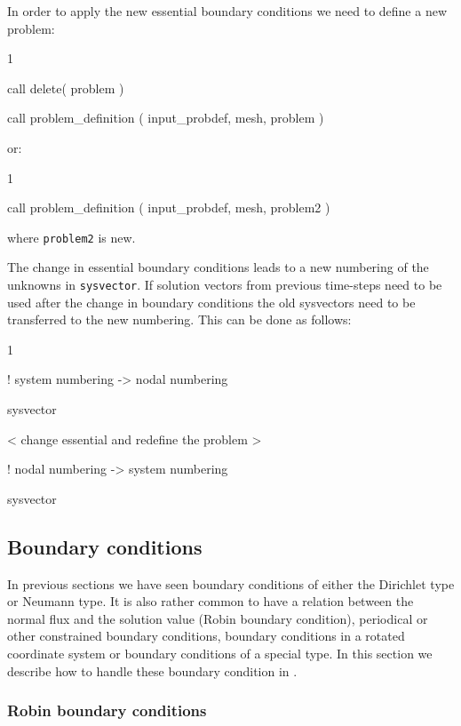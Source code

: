 In order to apply the new essential boundary conditions we need to define a new
problem:
\begin{listing}{1}

  call delete( problem )

  call problem_definition ( input_probdef, mesh, problem )
   
\end{listing}
or:
\begin{listing}{1}

  call problem_definition ( input_probdef, mesh, problem2 )
   
\end{listing}
where \texttt{problem2} is new.

The change in essential boundary conditions leads to a new numbering of the
unknowns in \texttt{sysvector}. If solution vectors from previous
time-steps need to
be used after the change in boundary conditions
the old sysvectors need to be transferred to the new
numbering. This can be done as follows:
\begin{listing}{1}

!  system numbering -> nodal numbering

   sysvector%

   < change essential and redefine the problem >

!  nodal numbering -> system numbering

   sysvector%
   
\end{listing}

\subsection{Boundary conditions}

\label{sec:bounc}

In previous sections we have seen boundary conditions of either
the Dirichlet type or Neumann type. It is also rather common to have a relation
between the normal flux and the solution value (Robin boundary condition),
periodical or  other constrained boundary conditions, boundary conditions in a
rotated coordinate system or
boundary conditions of a special type. In this section we describe how to
handle these boundary condition in \tfem.

\subsubsection{Robin boundary conditions}

